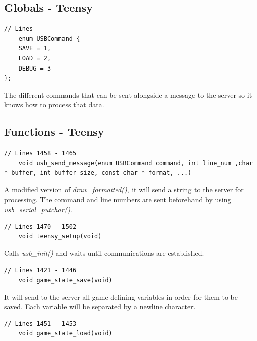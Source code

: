 \documentclass{article}
\begin{document}
\subsection*{Globals - Teensy}
\begin{lstlisting}[style=CStyle]
	// Lines
	enum USBCommand {
    SAVE = 1,
    LOAD = 2,
    DEBUG = 3
};
\end{lstlisting}
The different commands that can be sent alongside a message to the server so it knows how to process that data.
\newline

\subsection*{Functions - Teensy}
\begin{lstlisting}[style=CStyle]
	// Lines 1458 - 1465
	void usb_send_message(enum USBCommand command, int line_num ,char * buffer, int buffer_size, const char * format, ...)
\end{lstlisting}
A modified version of \emph{draw\_formatted()}, it will send a string to the server for processing. The command and line numbers are sent beforehand by using \emph{usb\_serial\_putchar()}.
\begin{lstlisting}[style=CStyle]
	// Lines 1470 - 1502
	void teensy_setup(void)
\end{lstlisting}
Calls \emph{usb\_init()} and waits until communications are established. 
\begin{lstlisting}[style=CStyle]
	// Lines 1421 - 1446
	void game_state_save(void)
\end{lstlisting}
It will send to the server all game defining variables in order for them to be saved. Each variable will be separated by a newline character.
\begin{lstlisting}[style=CStyle]
	// Lines 1451 - 1453
	void game_state_load(void)
\end{lstlisting}
\end{document}
